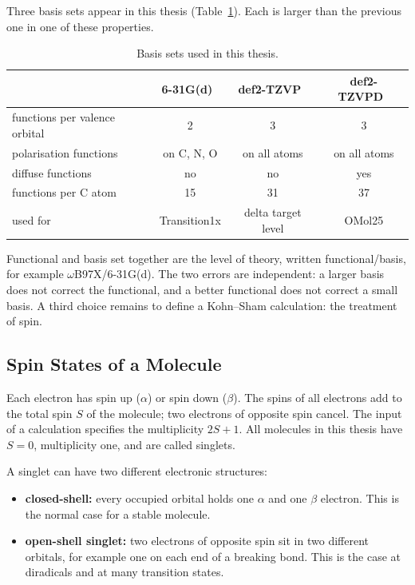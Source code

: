 Three basis sets appear in this thesis (Table~\ref{tab:basis}). Each is
larger than the previous one in one of these properties.

\begin{table}[h]
\centering
\caption{Basis sets used in this thesis.}
\label{tab:basis}
\begin{tabular}{@{}lccc@{}}
\toprule
 & 6-31G(d)~\cite{hariharan1973} & def2-TZVP~\cite{weigend2005} & def2-TZVPD~\cite{rappoport2010} \\
\midrule
functions per valence orbital & 2 & 3 & 3 \\
polarisation functions        & on C, N, O & on all atoms & on all atoms \\
diffuse functions             & no & no & yes \\
functions per C atom          & 15 & 31 & 37 \\
\midrule
used for & Transition1x & delta target level & OMol25 \\
\bottomrule
\end{tabular}
\end{table}

Functional and basis set together are the level of theory, written
functional/basis, for example \mbox{$\omega$B97X/6-31G(d)}. The two
errors are independent: a larger basis does not correct the functional,
and a better functional does not correct a small basis. A third choice
remains to define a Kohn--Sham calculation: the treatment of spin.


\subsection{Spin States of a Molecule}
\label{sec:background-spinstates}

Each electron has spin up ($\alpha$) or spin down ($\beta$). The spins of
all electrons add to the total spin $S$ of the molecule; two electrons of
opposite spin cancel. The input of a calculation specifies the
multiplicity $2S + 1$. All molecules in this thesis have $S = 0$,
multiplicity one, and are called singlets.

A singlet can have two different electronic structures:

\begin{itemize}
  \item \textbf{closed-shell:} every occupied orbital holds one $\alpha$
    and one $\beta$ electron. This is the normal case for a stable
    molecule.
  \item \textbf{open-shell singlet:} two electrons of opposite spin sit in
    two different orbitals, for example one on each end of a breaking
    bond. This is the case at diradicals and at many transition states.
\end{itemize}


